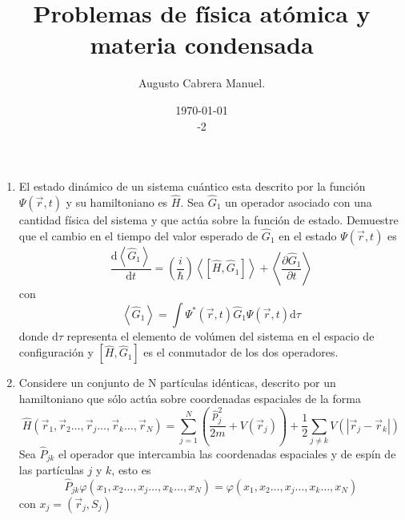 \documentclass[]{article}
\title{Problemas de física atómica y materia condensada}
\author{Augusto Cabrera Manuel.}
\date{\today\\ \ser 1 \sem 2018-2 }
\begin{document}
\maketitle
\begin{enumerate}
\item El estado dinámico de un sistema cuántico esta descrito por la función $\Psi(\vec{r},t)$ y su hamiltoniano es $\hat{H}$. Sea $\hat{G}_1$ un operador asociado con una cantidad física del sistema y que actúa sobre la función de estado. Demuestre que el cambio en el tiempo del valor esperado de $\hat{G}_1$ en el estado $\Psi(\vec{r},t)$ es
  \begin{equation*}
    \frac{\mathrm{d}\left<\hat{G}_1\right>}{\mathrm{d}t}=\left(\frac{i}{\hbar}\right)\left<\left[\hat{H},\hat{G}_1\right]\right>+\left<\frac{\partial\hat{G}_1}{\partial t}\right>
  \end{equation*}
con
\begin{equation*}
  \left<\hat{G}_1\right>=\int\Psi^*(\vec{r},t)\hat{G}_1\Psi(\vec{r},t)\mathrm{d}\tau
\end{equation*}
donde $\mathrm{d}\tau$ representa el elemento de volúmen del sistema en el espacio de configuración y $\left[\hat{H},\hat{G}_1\right]$ es el conmutador de los dos operadores.
\item Considere un conjunto de N partículas idénticas, descrito por un hamiltoniano que sólo actúa sobre coordenadas espaciales de la forma
  \begin{equation*}
    \hat{H}(\vec{r}_1,\vec{r}_2\dots ,\vec{r}_j\dots ,\vec{r}_k\dots ,\vec{r}_N)=\sum_{j=1}^N\left(\frac{\hat{p}_j^2}{2m}+V\left(\vec{r}_j\right)\right)+\frac{1}{2}\sum_{j\neq k}V\left(\left|\vec{r}_j-\vec{r}_k\right|\right)
  \end{equation*}
Sea $\hat{P}_{jk}$ el operador que intercambia las coordenadas espaciales y de espín de las partículas $j$ y $k$, esto es
\begin{equation*}
  \hat{P}_{jk}\varphi\left(x_1, x_2\dots ,x_j\dots ,x_k\dots ,x_N\right)=\varphi\left(x_1, x_2\dots ,x_j\dots ,x_k\dots ,x_N\right)
\end{equation*}
con $x_j=(\vec{r}_j,S_j)$


\end{enumerate}
\end{document}
